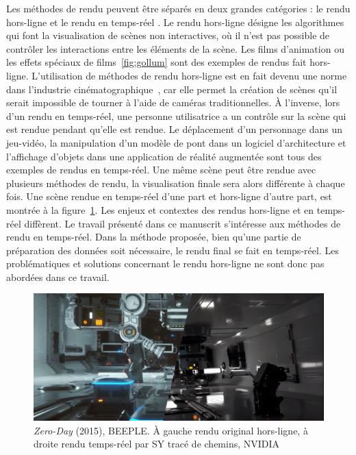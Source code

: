 Les méthodes de rendu peuvent être séparés en deux grandes catégories : le rendu \og hors-ligne \fg et le rendu \og en temps-réel \fg. Le rendu hors-ligne désigne les algorithmes qui font la visualisation de scènes non interactives, où il n'est pas possible de contrôler les interactions entre les éléments de la scène. Les films d'animation ou les effets spéciaux de films~\ref{fig:gollum} sont des exemples de rendus fait hors-ligne. L'utilisation de méthodes de rendu hors-ligne est en fait devenu une norme dans l'industrie cinématographique~\cite{media_history_2021}, car elle permet la création de scènes qu'il serait impossible de tourner à l'aide de caméras traditionnelles. À l'inverse, lors d'un rendu en temps-réel, une personne utilisatrice a un contrôle sur la scène qui est rendue pendant qu'elle est rendue. Le déplacement d'un personnage dans un jeu-vidéo, la manipulation d'un modèle de pont dans un logiciel d'architecture et l'affichage d'objets dans une application de réalité augmentée sont tous des exemples de rendus en temps-réel. Une même scène peut être rendue avec plusieurs méthodes de rendu, la visualisation finale sera alors différente à chaque fois. Une scène rendue en temps-réel d'une part et hors-ligne d'autre part, est montrée à la figure~\ref{fig:zero-day}. Les enjeux et contextes des rendus hors-ligne et en temps-réel diffèrent. Le travail présenté dans ce manuscrit s'intéresse aux méthodes de rendu en temps-réel. Dans la méthode proposée, bien qu'une partie de préparation des données soit nécessaire, le rendu final se fait en temps-réel. Les problématiques et solutions concernant le rendu hors-ligne ne sont donc pas abordées dans ce travail.

\bigskip

\begin{figure}[h]
    \centering
    \includegraphics[width=\textwidth]{contenu/resources/images/zero_day_comparison}
    \caption[{\it Zero-Day} (2015), BEEPLE]{{\it Zero-Day} (2015), BEEPLE. À gauche rendu original hors-ligne, à droite rendu temps-réel par SY tracé de chemins, NVIDIA~\cite{winkelman_zero-day_2019}}
    \label{fig:zero-day}
\end{figure}

